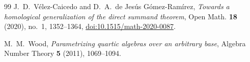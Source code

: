 \begin{thebibliography}{99}
J.~D.~V\'elez-Caicedo and D.~A.~de Jes\'us G\'omez-Ram\'irez,
\emph{Towards a homological generalization of the direct summand theorem},
Open Math. \textbf{18} (2020), no.~1, 1352--1364,
\href{https://doi.org/10.1515/math-2020-0087}{doi:10.1515/math-2020-0087}.

M.~M.~Wood,
\emph{Parametrizing quartic algebras over an arbitrary base},
Algebra Number Theory \textbf{5} (2011), 1069--1094.

\end{thebibliography}
